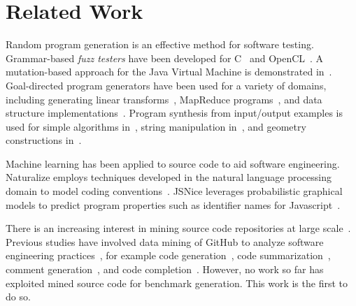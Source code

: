 \section{Related Work} \label{sec:rw}

Random program generation is an effective method for software testing. Grammar-based \emph{fuzz testers} have been developed for C~\cite{Yang2012} and OpenCL~\cite{Lidbury2015a}. A mutation-based approach for the Java Virtual Machine is demonstrated in~\cite{Chena}. Goal-directed program generators have been used for a variety of domains, including generating linear transforms~\cite{Voronenko2009}, MapReduce programs~\cite{Smith}, and data structure implementations~\cite{Loncaric2016}. Program synthesis from input/output examples is used for simple algorithms in~\cite{Zaremba2015a}, string manipulation in~\cite{Gulwani2011}, and geometry constructions in~\cite{Gulwani2012}.

Machine learning has been applied to source code to aid software engineering. Naturalize employs techniques developed in the natural language processing domain to model coding conventions~\cite{Allamanis2014a}. JSNice leverages probabilistic graphical models to predict program properties such as identifier names for Javascript~\cite{Raychev}.

There is an increasing interest in mining source code repositories at large scale~\cite{Allamanis2013a,White2015a,Bird2009}. Previous studies have involved data mining of GitHub to analyze software engineering practices~\cite{Wu2014,Guzman2014,Baishakhi2014a,Vasilescu2015}, for example code generation~\cite{Zhang2015a}, code summarization~\cite{Allamanis2016}, comment generation~\cite{Wong2013}, and code completion~\cite{Raychev2014}. However, no work so far has exploited mined source code for benchmark generation. This work is the first to do so.